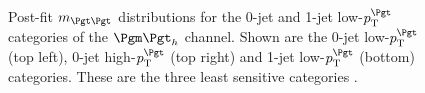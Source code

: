 \begin{figure}[tbh]


\caption[Post-fit $m_{\Pgt\Pgt}$ distributions for the 0-jet and 1-jet low-$\pt^{\Pgt}$ 
categories of the $\mutau$ channel.]{Post-fit $m_{\Pgt\Pgt}$ distributions for
the 0-jet and 1-jet low-$\pt^{\Pgt}$ categories of the $\mutau$ channel. Shown are the 0-jet
low-$\pt^{\Pgt}$ (top left), 0-jet high-$\pt^{\Pgt}$ (top right) and 1-jet
low-$\pt^{\Pgt}$ (bottom) categories. These are the three least sensitive categories \cite{HIG-13-004}.}
\label{fig:postfit0jet1jetmutau}
\end{figure}

